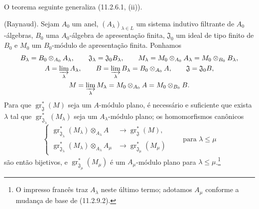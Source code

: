 O teorema seguinte generaliza (11.2.6.1, (ii)).

\begin{theorem}[11.2.9]
\label{IV.11.2.9}
(Raynaud). Sejam $A_0$ um anel, $(A_\lambda)_{\lambda\in L}$ um sistema indutivo filtrante de $A_0$-álgebras, $B_0$ uma $A_0$-álgebra de apresentação finita, $\mathfrak J_0$ um ideal de tipo finito de $B_0$ e $M_0$ um $B_0$-módulo de apresentação finita. Ponhamos
\[
\begin{gathered}
B_\lambda=B_0\otimes_{A_0}A_\lambda,\qquad
\mathfrak J_\lambda=\mathfrak J_0B_\lambda,\qquad
M_\lambda=M_0\otimes_{A_0}A_\lambda=M_0\otimes_{B_0}B_\lambda,\\
A=\varinjlim_\lambda A_\lambda,\qquad
B=\varinjlim_\lambda B_\lambda=B_0\otimes_{A_0}A,\qquad
\mathfrak J=\mathfrak J_0B,\\
M=\varinjlim_\lambda M_\lambda
=M_0\otimes_{A_0}A=M_0\otimes_{B_0}B.
\end{gathered}
\]
Para que $\operatorname{gr}_{\mathfrak J}^*(M)$ seja um $A$-módulo plano, é necessário e suficiente que exista $\lambda$ tal que $\operatorname{gr}_{\mathfrak J_\lambda}^*(M_\lambda)$ seja um $A_\lambda$-módulo plano; os homomorfismos canônicos
\begin{equation}
\left\{
\begin{aligned}
\operatorname{gr}_{\mathfrak J_\lambda}^*(M_\lambda)
\otimes_{A_\lambda}A&\longrightarrow
\operatorname{gr}_{\mathfrak J}^*(M),\\
\operatorname{gr}_{\mathfrak J_\lambda}^*(M_\lambda)
\otimes_{A_\lambda}A_\mu&\longrightarrow
\operatorname{gr}_{\mathfrak J_\mu}^*(M_\mu)
\end{aligned}
\right.
\qquad\text{para }\lambda\leq\mu
\label{IV.11.2.9.1}
\tag{11.2.9.1}
\end{equation}
são então bijetivos, e $\operatorname{gr}_{\mathfrak J_\mu}^*(M_\mu)$ é um $A_\mu$-módulo plano para $\lambda\leq\mu$.\footnote{O impresso francês traz $A_\lambda$ neste último termo; adotamos $A_\mu$ conforme a mudança de base de (11.2.9.2).}
\end{theorem}

